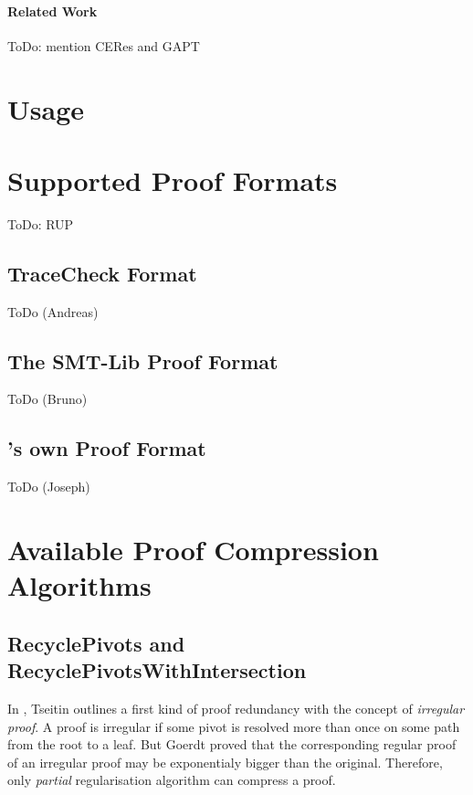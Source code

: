 \documentclass{llncs}
\begin{document}
\paragraph{Related Work} ToDo: mention CERes and GAPT


\section{Usage}



\section{Supported Proof Formats}
\label{sec:ProofFormats}

ToDo: RUP

\subsection{TraceCheck Format}

ToDo (Andreas)

\subsection{The SMT-Lib Proof Format}

{\veriT}

ToDo (Bruno)

\subsection{{\skeptik}'s own Proof Format}

ToDo (Joseph)


\section{Available Proof Compression Algorithms}

\subsection{RecyclePivots and RecyclePivotsWithIntersection}

In \cite{Tseitin}, Tseitin outlines a first kind of proof redundancy with the concept of
\emph{irregular proof}. A proof is irregular if some pivot is resolved more than once on some path
from the root to a leaf. But Goerdt \cite{Goerdt} proved that the corresponding regular proof of an
irregular proof may be exponentialy bigger than the original. Therefore, only \emph{partial}
regularisation algorithm can compress a proof.
\end{document}
